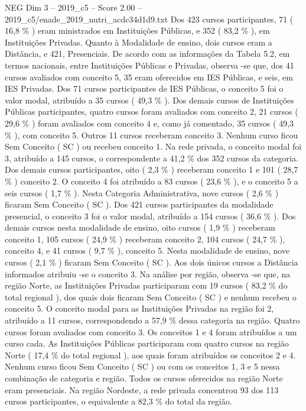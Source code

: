 \begin{textsample}{NEG Dim 3 – 2019\_c5 – Score 2.00 – 2019\_c5/enade\_2019\_nutri\_acdc34d1d9.txt}
Dos 423 cursos participantes, 71 ( 16,8 \% ) eram ministrados em Instituições Públicas, e 352 ( 83,2 \% ), em Instituições Privadas.
Quanto à Modalidade de ensino, dois cursos eram a Distância, e 421, Presenciais.
De acordo com as informações da Tabela 5.2, em termos nacionais, entre Instituições Públicas e Privadas, observa -se que, dos 41 cursos avaliados com conceito 5, 35 eram oferecidos em IES Públicas, e seis, em IES Privadas.
Dos 71 cursos participantes de IES Públicas, o conceito 5 foi o valor modal, atribuído a 35 cursos ( 49,3 \% ).
Dos demais cursos de Instituições Públicas participantes, quatro cursos foram avaliados com conceito 2, 21 cursos ( 29,6 \% ) foram avaliados com conceito 4 e, como já comentado, 35 cursos ( 49,3 \% ), com conceito 5.
Outros 11 cursos receberam conceito 3.
Nenhum curso ficou Sem Conceito ( SC ) ou recebeu conceito 1.
Na rede privada, o conceito modal foi 3, atribuído a 145 cursos, o correspondente a 41,2 \% dos 352 cursos da categoria.
Dos demais cursos participantes, oito ( 2,3 \% ) receberam conceito 1 e 101 ( 28,7 \% ) conceito 2.
O conceito 4 foi atribuído a 83 cursos ( 23,6 \% ), e o conceito 5 a seis cursos ( 1,7 \% ).
Nesta Categoria Administrativa, nove cursos ( 2,6 \% ) ficaram Sem Conceito ( SC ).
Dos 421 cursos participantes da modalidade presencial, o conceito 3 foi o valor modal, atribuído a 154 cursos ( 36,6 \% ).
Dos demais cursos nesta modalidade de ensino, oito cursos ( 1,9 \% ) receberam conceito 1, 105 cursos ( 24,9 \% ) receberam conceito 2, 104 cursos ( 24,7 \% ), conceito 4, e 41 cursos ( 9,7 \% ), conceito 5.
Nesta modalidade de ensino, nove cursos ( 2,1 \% ) ficaram Sem Conceito ( SC ).
Aos dois únicos cursos a Distância informados atribuiu -se o conceito 3.
Na análise por região, observa -se que, na região Norte, as Instituições Privadas participaram com 19 cursos ( 83,2 \% do total regional ), dos quais dois ficaram Sem Conceito ( SC ) e nenhum recebeu o conceito 5.
O conceito modal para as Instituições Privadas na região foi 2, atribuído a 11 cursos, correspondendo a 57,9 \% dessa categoria na região.
Quatro cursos foram avaliados com conceito 3.
Os conceitos 1 e 4 foram atribuídos a um curso cada.
As Instituições Públicas participaram com quatro cursos na região Norte ( 17,4 \% do total regional ), aos quais foram atribuídos os conceitos 2 e 4.
Nenhum curso ficou Sem Conceito ( SC ) ou com os conceitos 1, 3 e 5 nessa combinação de categoria e região.
Todos os cursos oferecidos na região Norte eram presenciais.
Na região Nordeste, a rede privada concentrou 93 dos 113 cursos participantes, o equivalente a 82,3 \% do total da região.

\end{textsample}
